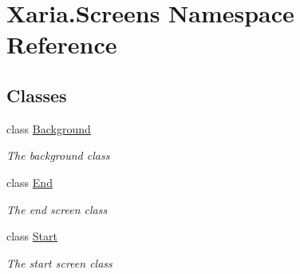 \hypertarget{namespaceXaria_1_1Screens}{}\section{Xaria.\+Screens Namespace Reference}
\label{namespaceXaria_1_1Screens}
\subsection*{Classes}
\begin{DoxyCompactItemize}
\item 
class \hyperlink{classXaria_1_1Screens_1_1Background}{Background}
\begin{DoxyCompactList}\small\item\em The background class \end{DoxyCompactList}\item 
class \hyperlink{classXaria_1_1Screens_1_1End}{End}
\begin{DoxyCompactList}\small\item\em The end screen class \end{DoxyCompactList}\item 
class \hyperlink{classXaria_1_1Screens_1_1Start}{Start}
\begin{DoxyCompactList}\small\item\em The start screen class \end{DoxyCompactList}\end{DoxyCompactItemize}
